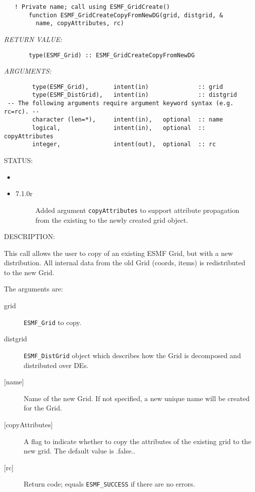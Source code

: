  
\begin{verbatim}   ! Private name; call using ESMF_GridCreate()
       function ESMF_GridCreateCopyFromNewDG(grid, distgrid, &
         name, copyAttributes, rc)\end{verbatim}{\em RETURN VALUE:}
\begin{verbatim}       type(ESMF_Grid) :: ESMF_GridCreateCopyFromNewDG\end{verbatim}{\em ARGUMENTS:}
\begin{verbatim}        type(ESMF_Grid),       intent(in)              :: grid
        type(ESMF_DistGrid),   intent(in)              :: distgrid
 -- The following arguments require argument keyword syntax (e.g. rc=rc). --
        character (len=*),     intent(in),   optional  :: name
        logical,               intent(in),   optional  :: copyAttributes
        integer,               intent(out),  optional  :: rc\end{verbatim}
{\sf STATUS:}
   \begin{itemize}
   \item{}
   \item{}
   \begin{description}
   \item[7.1.0r] Added argument {\tt copyAttributes} to support attribute
                 propagation from the existing to the newly created grid object.
   \end{description}
   \end{itemize}
  
{\sf DESCRIPTION:\\ }


   This call allows the user to copy of an existing ESMF Grid, but with a new distribution.
   All internal data from the old Grid (coords, items) is redistributed to the new Grid.
  
   The arguments are:
   \begin{description}
   \item[grid]
       {\tt ESMF\_Grid} to copy.
   \item[distgrid]
        {\tt ESMF\_DistGrid} object which describes how the Grid is decomposed and
        distributed over DEs.
   \item[{[name]}]
        Name of the new Grid. If not specified, a new unique name will be created
        for the Grid.
   \item[{[copyAttributes]}]
        A flag to indicate whether to copy the attributes of the existing grid
        to the new grid.  The default value is .false..
   \item[{[rc]}]
        Return code; equals {\tt ESMF\_SUCCESS} if there are no errors.
   \end{description}
   
